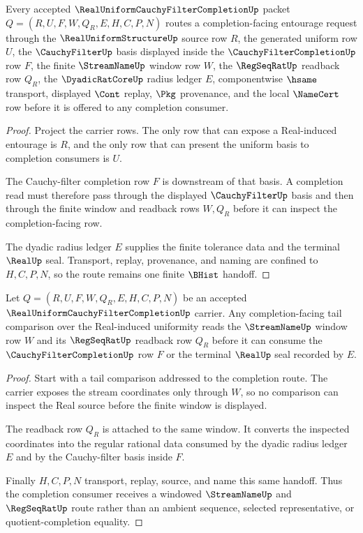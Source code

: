 \begin{theorem}
\label{thm:real-uniform-cauchy-filter-completion-entourage-route}
Every accepted $\RealUniformCauchyFilterCompletionUp$ packet $Q=(R,U,F,W,Q_R,E,H,C,P,N)$ routes a completion-facing entourage request through the $\RealUniformStructureUp$ source row $R$, the generated uniform row $U$, the $\CauchyFilterUp$ basis displayed inside the $\CauchyFilterCompletionUp$ row $F$, the finite $\StreamNameUp$ window row $W$, the $\RegSeqRatUp$ readback row $Q_R$, the $\DyadicRatCoreUp$ radius ledger $E$, componentwise $\hsame$ transport, displayed $\Cont$ replay, $\Pkg$ provenance, and the local $\NameCert$ row before it is offered to any completion consumer.
\end{theorem}
\begin{proof}
Project the carrier rows. The only row that can expose a Real-induced entourage is $R$, and the only row that can present the uniform basis to completion consumers is $U$.

The Cauchy-filter completion row $F$ is downstream of that basis. A completion read must therefore pass through the displayed $\CauchyFilterUp$ basis and then through the finite window and readback rows $W,Q_R$ before it can inspect the completion-facing row.

The dyadic radius ledger $E$ supplies the finite tolerance data and the terminal $\RealUp$ seal. Transport, replay, provenance, and naming are confined to $H,C,P,N$, so the route remains one finite $\BHist$ handoff.
\end{proof}

\begin{theorem}
\label{thm:real-uniform-cauchy-filter-completion-window-handoff}
Let $Q=(R,U,F,W,Q_R,E,H,C,P,N)$ be an accepted $\RealUniformCauchyFilterCompletionUp$ carrier. Any completion-facing tail comparison over the Real-induced uniformity reads the $\StreamNameUp$ window row $W$ and its $\RegSeqRatUp$ readback row $Q_R$ before it can consume the $\CauchyFilterCompletionUp$ row $F$ or the terminal $\RealUp$ seal recorded by $E$.
\end{theorem}
\begin{proof}
Start with a tail comparison addressed to the completion route. The carrier exposes the stream coordinates only through $W$, so no comparison can inspect the Real source before the finite window is displayed.

The readback row $Q_R$ is attached to the same window. It converts the inspected coordinates into the regular rational data consumed by the dyadic radius ledger $E$ and by the Cauchy-filter basis inside $F$.

Finally $H,C,P,N$ transport, replay, source, and name this same handoff. Thus the completion consumer receives a windowed $\StreamNameUp$ and $\RegSeqRatUp$ route rather than an ambient sequence, selected representative, or quotient-completion equality.
\end{proof}

